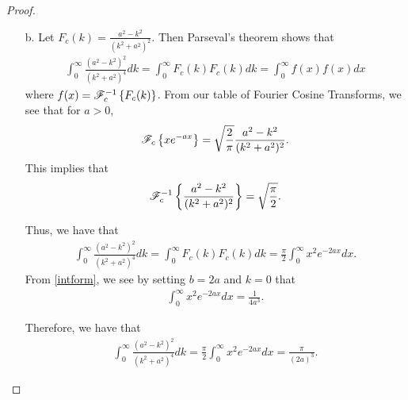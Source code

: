 \begin{proof}
\begin{enumerate}
    \item[b.] Let $\displaystyle F_c(k) = \frac{a^2-k^2}{(k^2+a^2)^2}$.
      Then Parseval's theorem shows that
      \begin{align*}
        \int_0^\infty \frac{(a^2 - k^2)^2}{(k^2+a^2)^4} dk = \int_0^\infty F_c(k)F_c(k)dk = \int_0^\infty f(x)f(x)dx
      \end{align*}
      where $f(x) = \mathscr{F}_c^{-1}\left\{ {F_c(k)} \right\}$. From our table
      of Fourier Cosine Transforms, we see that for $a > 0$,
      \begin{align*}
        \mathscr{F}_c\left\{ {x e^{-a x}} \right\} = \sqrt{\frac{2}{\pi}}\frac{a^2-k^2}{(k^2+a^2)^2}.
      \end{align*}
      This implies that
      \begin{align*}
        \mathscr{F}_c^{-1}\left\{ {\frac{a^2-k^2}{(k^2+a^2)^2}} \right\} = \sqrt{\frac{\pi}{2}}.
      \end{align*}

      Thus, we have that
      \begin{align*}
        \int_0^\infty \frac{(a^2 - k^2)^2}{(k^2+a^2)^4} dk = \int_0^\infty F_c(k)F_c(k)dk = \frac{\pi}{2}\int_0^\infty x^2e^{-2ax}dx.
      \end{align*}
      From \eqref{intform}, we see by setting $b = 2a$ and $k=0$ that
      \begin{align*}
        \int_0^\infty x^2e^{-2ax}dx = \frac{1}{4a^3}.
      \end{align*}

      Therefore, we have that
      \begin{align*}
        \int_0^\infty \frac{(a^2 - k^2)^2}{(k^2+a^2)^4} dk = \frac{\pi}{2}\int_0^\infty x^2e^{-2ax}dx = \frac{\pi}{(2a)^3}.
      \end{align*}
  \end{enumerate}
\end{proof}
\newpage
